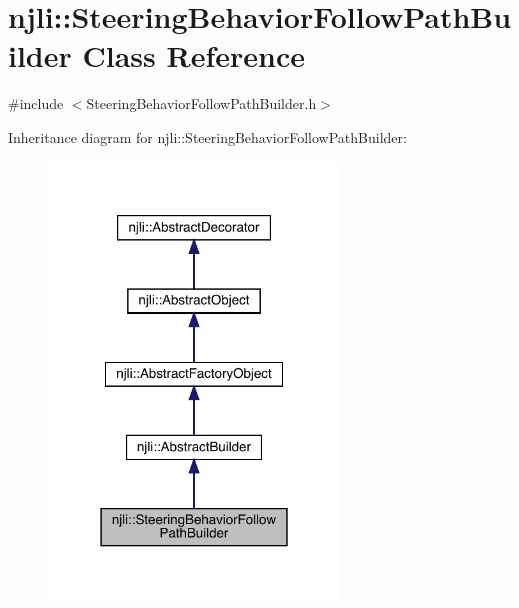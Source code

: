 \hypertarget{classnjli_1_1_steering_behavior_follow_path_builder}{}\section{njli\+:\+:Steering\+Behavior\+Follow\+Path\+Builder Class Reference}
\label{classnjli_1_1_steering_behavior_follow_path_builder}


{\ttfamily \#include $<$Steering\+Behavior\+Follow\+Path\+Builder.\+h$>$}



Inheritance diagram for njli\+:\+:Steering\+Behavior\+Follow\+Path\+Builder\+:\nopagebreak
\begin{figure}[H]
\begin{center}
\leavevmode
\includegraphics[width=219pt]{classnjli_1_1_steering_behavior_follow_path_builder__inherit__graph}
\end{center}
\end{figure}



